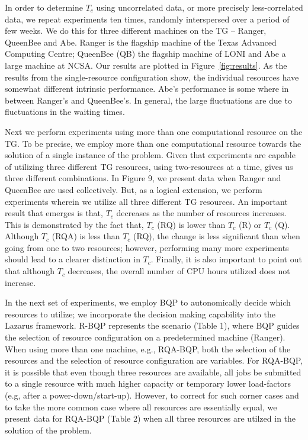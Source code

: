 \documentclass{sig-alternate}
\newcommand{\tc}{$T_c$ }
\newcommand{\tcnsp}{$T_c$}
\begin{document}
In order to determine \tc using uncorrelated data, or more precisely less-correlated data, we repeat experiments ten times, randomly interspersed over a period of few weeks.  We do this for three different machines on the TG -- Ranger, QueenBee and Abe.  Ranger is the flagship machine of the Texas Advanced Computing Centre; QueenBee (QB) the flagship machine of LONI and Abe a large machine at NCSA. Our results are plotted in Figure~\ref{fig:results}.  As the results from the single-resource configuration show, the individual resources have somewhat different intrinsic performance.  Abe's performance is some where in between Ranger's and QueenBee's.  In general, the large fluctuations are due to fluctuations in the waiting times.

Next we perform experiments using more than one computational resource on the TG. To be precise, we employ more than one computational resource towards the solution of a single instance of the problem.  Given that experiments are capable of utilizing three different TG resources, using two-resources at a time, gives us three different combinations. In Figure 9, we present data when Ranger and QueenBee are used collectively.  But, as a logical extension, we perform experiments wherein we utilize all three different TG resources. An important result that emerges is
that, \tc decreases as the number of resources increases. This is demonstrated by the fact that, \tc (RQ) is lower than \tc (R) or \tc (Q).  Although \tc (RQA) is less than \tc (RQ), the change is less significant than when going from one to two resources; however, performing many more experiments should lead to a clearer distinction in \tcnsp.
Finally, it is also important to point out that although \tc decreases, the overall number of CPU hours utilized does not increase. %

In the next set of experiments, we employ BQP to autonomically decide which resources to utilize; we incorporate the decision making capability into the Lazarus framework.  R-BQP represents the scenario (Table 1), where BQP guides the selection of resource configuration on a predetermined machine (Ranger).  When using more than one machine, e.g., RQA-BQP, %
both the selection of the resources and the selection of resource configuration are variables. For RQA-BQP, it is possible that even though three resources are available, all jobs be submitted to a single resource with much higher capacity or temporary lower load-factors (e.g, after a power-down/start-up). However, to correct for such corner cases and to take the more common case where all resources are essentially equal, we present data for RQA-BQP (Table 2) when all three resources are utilzed in the solution of the problem.
\end{document}
